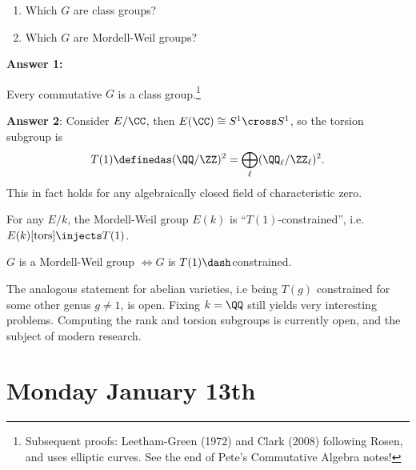 \begin{enumerate}
\def\labelenumi{\arabic{enumi}.}
\tightlist
\item
  Which \(G\) are class groups?
\item
  Which \(G\) are Mordell-Weil groups?
\end{enumerate}

\textbf{Answer 1:}

\begin{theorem}[Clayborn, 1966]

Every commutative \(G\) is a class group.\footnote{Subsequent proofs:
  Leetham-Green (1972) and Clark (2008) following Rosen, and uses
  elliptic curves. See the end of Pete's Commutative Algebra notes!}

\end{theorem}

\textbf{Answer 2}: Consider \(E/\CC\), then
\(E(\CC) \cong S^1 \cross S^1\), so the torsion subgroup is
\begin{align*}
T(1) \definedas (\QQ/\ZZ)^2 = \bigoplus_{\ell} (\QQ_\ell/\ZZ_\ell)^2
.\end{align*} This in fact holds for any algebraically closed field of
characteristic zero.

\begin{fact}

For any \(E/k\), the Mordell-Weil group \(E(k)\) is
``\(T(1)\)-constrained'', i.e.~\(E(k)[\mathrm{tors}] \injects T(1)\).

\end{fact}

\begin{theorem}[Clark, 2012]

\(G\) is a Mordell-Weil group \(\iff G\) is \(T(1)\dash\)constrained.

\end{theorem}

\begin{remark}

The analogous statement for abelian varieties, i.e being \(T(g)\)
constrained for some other genus \(g\neq 1\), is open. Fixing \(k= \QQ\)
still yields very interesting problems. Computing the rank and torsion
subgroups is currently open, and the subject of modern research.

\end{remark}

\hypertarget{monday-january-13th}{%
\section{Monday January 13th}\label{monday-january-13th}}

